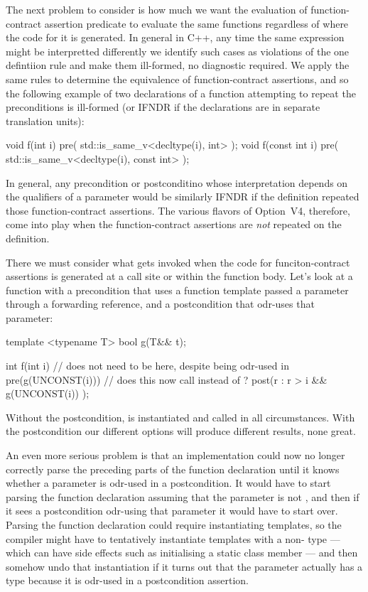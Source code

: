 The next problem to consider is how much we want the evaluation of function-contract assertion predicate to evaluate the same functions regardless of where the code for it is generated.  In general in C++, any time the same expression might be interpretted differently we identify such cases as violations of the one defintiion rule and make them ill-formed, no diagnostic required.   We apply the same rules to determine the equivalence of function-contract assertions, and so the following example of two declarations of a function attempting to repeat the preconditions is ill-formed (or IFNDR if the declarations are in separate translation units):
\begin{codeblock}
void f(int i)       pre( std::is_same_v<decltype(i), int> );
void f(const int i) pre( std::is_same_v<decltype(i), const int> );
\end{codeblock}
In general, any precondition or postconditino whose interpretation depends on the  qualifiers of a parameter would be similarly IFNDR if the definition repeated those function-contract assertions.  The various flavors of Option~V4, therefore, come into play when the function-contract assertions are \emph{not} repeated on the definition.

There we must consider what gets invoked when the code for funciton-contract assertions is generated at a call site or within the function body.  Let's look at a function with a precondition that uses a function template passed a parameter through a forwarding reference, and a postcondition that odr-uses that parameter:
\begin{codeblock}
template <typename T>
bool g(T&& t);

int f(int i)  //  does not need to be  here, despite being odr-used in 
  pre(g(UNCONST(i)))   // does this now call  instead of ?
  post(r : r > i && g(UNCONST(i)) );
\end{codeblock}
Without the postcondition,  is instantiated and called in all circumstances.  With the postcondition our different options will produce different results, none great.


An even more serious problem is that an implementation could now no longer correctly parse the preceding parts of the function declaration until it knows whether a parameter is odr-used in a postcondition. It would have to start parsing the function declaration assuming that the parameter is not , and then if it sees a postcondition odr-using that parameter it would have to start over. Parsing the function declaration could require instantiating templates, so the compiler might have to tentatively instantiate templates with a non- type --- which can have side effects such as initialising a static class member --- and then somehow undo that instantiation if it turns out that the parameter actually has a  type because it is odr-used in a postcondition assertion.


